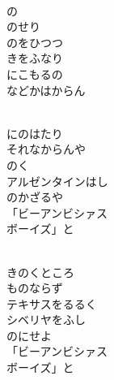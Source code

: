 \documentclass[10pt,b5j]{tarticle} %
\begin{document}
\begin{enumerate}
\begin{minipage}[c]{\blocksize}
        \vspace{\linespace}
        \item~\\
        の\\
        のせり\\
        のをひつつ\\
        きをふなり\\
        にこもるの\\
        などかはからん
        
        \vspace{\linespace}
        \item~\\
        にのはたり\\
        それなからんや\\
        のく\\
        アルゼンタインはし\\
        のかざるや\\
        「ビーアンビシァス\\
        ボーイズ」と
        
        \vspace{\linespace}
        \item~\\
        きのくところ\\
        ものならず\\
        テキサスをるるく\\
        シベリヤをふし\\
        のにせよ\\
        「ビーアンビシァス\\
        ボーイズ」と
    
    \end{minipage}
\end{enumerate} %
\end{document}
